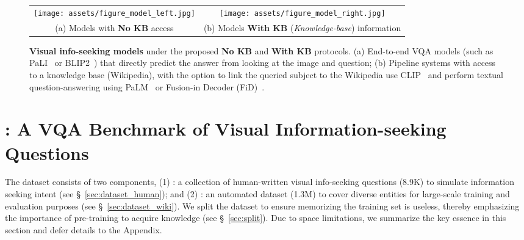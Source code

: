 \documentclass[11pt]{article}
\begin{document}
\begin{figure*}[!htbp]
    \centering
    \vspace{-5mm}
    \begin{tabular}{c@{\quad}c}
        \tabcolsep 0pt
        \texttt{[image: assets/figure\_model\_left.jpg]} & \texttt{[image: assets/figure\_model\_right.jpg]} \\
        {\footnotesize (a) Models with \textbf{No KB} access} & {\footnotesize (b) Models \textbf{With KB} {(\small \textit{Knowledge-base})} information}
    \end{tabular}
\caption{
    \textbf{Visual info-seeking models} under the proposed \textbf{No KB} and \textbf{With KB} protocols. 
    (a) End-to-end VQA models (such as PaLI~\cite{chen2022pali} or BLIP2~\cite{li2023blip}) that directly predict the answer from looking at the image and question; 
    (b) Pipeline systems with access to a knowledge base (\eg Wikipedia), with the option to link the queried subject to the Wikipedia use CLIP~\cite{radford2021clip} and perform textual question-answering using PaLM~\citep{chowdhery2022palm} or Fusion-in Decoder (FiD)~\cite{izacard2020fid}. 
    }
\label{fig:models}
\end{figure*} \section{{\infoseek}: A VQA Benchmark of Visual Information-seeking Questions}
\label{sec:dataset}
The \ourdataset dataset consists of two components, (1) \ourdataset: a collection of human-written visual info-seeking questions (8.9K) to simulate information seeking intent (see \S~\ref{sec:dataset_human}); and (2) \ourdataset: an automated dataset (1.3M) to cover diverse entities for large-scale training and evaluation purposes (see \S~\ref{sec:dataset_wiki}).
We split the dataset to ensure memorizing the training set is useless, thereby emphasizing the importance of pre-training to acquire knowledge (see \S~\ref{sec:split}). Due to space limitations, we summarize the key essence in this section and defer details to the Appendix.
\end{document}
